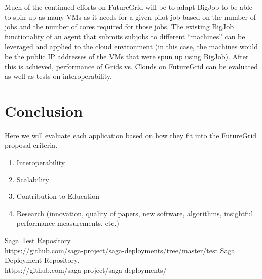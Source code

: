 \documentclass[]{paper}
\begin{document}
Much of the continued efforts on FutureGrid will be to adapt BigJob to be able to spin up as many VMs as it needs for a given pilot-job based on the number of jobs and the number of cores required for those jobs. The existing BigJob functionality of an agent that submits subjobs to different ``machines'' can be leveraged and applied to the cloud environment (in this case, the machines would be the public IP addresses of the VMs that were spun up using BigJob). After this is achieved, performance of Grids vs. Clouds on FutureGrid can be evaluated as well as tests on interoperability.


\section{Conclusion}
Here we will evaluate each application based on how they fit into the
FutureGrid proposal criteria.
\begin{enumerate}
\item Interoperability
\item Scalability
\item Contribution to Education
\item Research (innovation, quality of papers, new software, algorithms, insightful performance measurements, etc.)

\end{enumerate}


\begin{thebibliography}{99}
Saga Test Repository.\\ https://github.com/saga-project/saga-deployments/tree/master/test
Saga Deployment Repository.\\ https://github.com/saga-project/saga-deployments/


\end{thebibliography}
\end{document}
